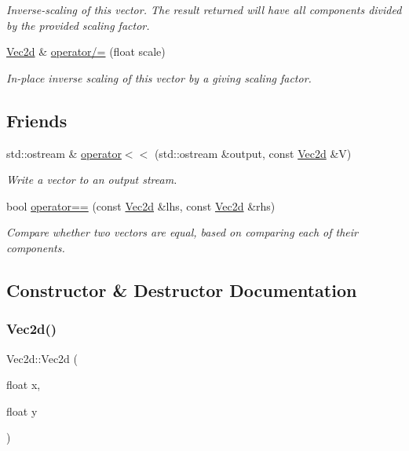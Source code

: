 \begin{DoxyCompactItemize}
\begin{DoxyCompactList}\small\item\em Inverse-\/scaling of this vector. The result returned will have all components divided by the provided scaling factor. \end{DoxyCompactList}\item 
\hyperlink{classVec2d}{Vec2d} \& \hyperlink{classVec2d_a99a52f2bea702660693f73fe0fb3c12c}{operator/=} (float scale)
\begin{DoxyCompactList}\small\item\em In-\/place inverse scaling of this vector by a giving scaling factor. \end{DoxyCompactList}\end{DoxyCompactItemize}
\subsection*{Friends}
\begin{DoxyCompactItemize}
\item 
std\+::ostream \& \hyperlink{classVec2d_a99f75efb61cca535cfd09970b7010180}{operator$<$$<$} (std\+::ostream \&output, const \hyperlink{classVec2d}{Vec2d} \&V)
\begin{DoxyCompactList}\small\item\em Write a vector to an output stream. \end{DoxyCompactList}\item 
bool \hyperlink{classVec2d_a251f9f3d4a41fea72fee64c142144071}{operator==} (const \hyperlink{classVec2d}{Vec2d} \&lhs, const \hyperlink{classVec2d}{Vec2d} \&rhs)
\begin{DoxyCompactList}\small\item\em Compare whether two vectors are equal, based on comparing each of their components. \end{DoxyCompactList}\end{DoxyCompactItemize}


\subsection{Constructor \& Destructor Documentation}
\mbox{\label{classVec2d_ae8a66a4b213a87a0baf92e818aca443e}} 
\subsubsection{\texorpdfstring{Vec2d()}{Vec2d()}}
{\footnotesize\ttfamily Vec2d\+::\+Vec2d (\begin{DoxyParamCaption}\item[{float}]{x,  }\item[{float}]{y }\end{DoxyParamCaption})}



